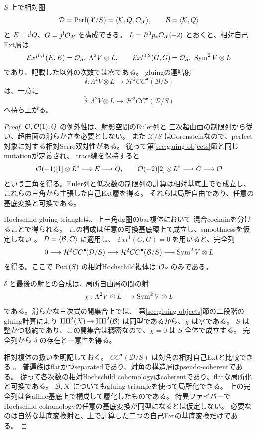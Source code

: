 \begin{lemma}[特異三次式を含む普遍的な持ち上げ]
\label{lem:universal-tangent-lift}
$S$ 上で相対圏
\[
 \mathcal D=\operatorname{Perf}(\mathcal X/S)
       =\langle\mathcal K,Q,\mathcal O_{\mathcal X}\rangle,
 \qquad\mathcal B=\langle\mathcal K,Q\rangle
\]
と $E=i^!Q$、$G=j^!\mathcal O_{\mathcal X}$ を構成できる。
$L=R^3p_*\mathcal O_{\mathcal X}(-2)$ とおくと、相対自己Ext層は
\[
 \mathcal E xt^{0,1}(E,E)=\mathcal O_S,\ \Lambda^2V\otimes L,
 \qquad
 \mathcal E xt^{0,2}(G,G)=\mathcal O_S,\ \operatorname{Sym}^2V\otimes L
\]
であり、記載した以外の次数では零である。
gluingの連結射
\[
 \delta:\Lambda^2V\otimes L
      \longrightarrow\mathcal H^2CC^\bullet(\mathcal B/S)
\]
は、一意に
\[
 \widetilde\delta:\Lambda^2V\otimes L
      \longrightarrow\mathcal H^2CC^\bullet(\mathcal D/S)
\]
へ持ち上がる。
\end{lemma}

\begin{proof}
$\mathcal O,\mathcal O(1),Q$ の例外性は、射影空間のEuler列と
三次超曲面の制限列から従い、超曲面の滑らかさを必要としない。
また $\mathcal X/S$ はGorensteinなので、perfect対象に対する相対Serre双対性がある。
従って第\ref{sec:gluing-objects}節と同じmutationが定義され、
trace線を保持すると
\[
 \mathcal O(-1)[1]\otimes L^*\longrightarrow E\longrightarrow Q,
 \qquad
 \mathcal O(-2)[2]\otimes L^*\longrightarrow G\longrightarrow\mathcal O
\]
という三角を得る。Euler列と低次数の制限列の計算は相対基底上でも成立し、
これらの三角から主張した自己Ext層を得る。
それらは局所自由であり、任意の基底変換と可換である。

Hochschild gluing triangleは、上三角dg圏のbar複体において
混合cochainを分けることで得られる。
この構成は任意の可換基底環上で成立し、smoothnessを仮定しない
\cite[Section 4.5, (4.5.1)--(4.5.2)]{KellerHoch}。
$\mathcal D=\langle\mathcal B,\mathcal O\rangle$ に適用し、
$\mathcal E xt^1(G,G)=0$ を用いると、完全列
\[
 0\longrightarrow\mathcal H^2CC^\bullet(\mathcal D/S)
 \longrightarrow\mathcal H^2CC^\bullet(\mathcal B/S)
 \longrightarrow\operatorname{Sym}^2V\otimes L
\]
を得る。ここで $\operatorname{Perf}(S)$ の相対Hochschild複体は $\mathcal O_S$ のみである。

$\delta$ と最後の射との合成は、局所自由層の間の射
\[
 \chi:\Lambda^2V\otimes L\longrightarrow\operatorname{Sym}^2V\otimes L
\]
である。滑らかな三次式の開集合上では、
第\ref{sec:gluing-objects}節の二段階のgluing計算により
$\operatorname{HH}^2(X)\to\operatorname{HH}^2(\mathcal B)$ は同型であるから、$\chi$ は零である。
$S$ は整かつ被約であり、この開集合は稠密なので、$\chi=0$ は $S$ 全体で成立する。
完全列から $\widetilde\delta$ の存在と一意性を得る。

相対複体の扱いを明記しておく。
$CC^\bullet(\mathcal D/S)$ は対角の相対自己Extと比較できる
\cite[Section 8.1, Theorem 8.9]{ToenMorita}。
普遍族はflatかつseparatedであり、対角の構造層はpseudo-coherentである。
従って各次数の相対Hochschild cohomologyはcoherentであり、flatな局所化と可換である。
$\mathcal B,\mathcal K$ についてもgluing triangleを使って局所化できる。
上の完全列は各affine基底上で構成して層化したものである。
特異ファイバーでHochschild cohomologyの任意の基底変換が同型になるとは仮定しない。
必要なのは自然な基底変換射と、上で計算した二つの自己Extの基底変換だけである。
\end{proof}


